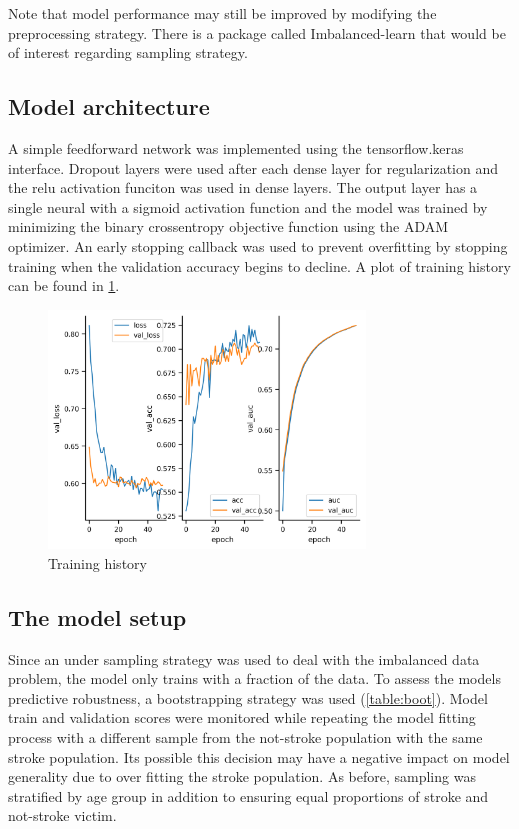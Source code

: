 \documentclass[12pt]{article}
\begin{document}
    Note that model performance may still be improved by modifying the preprocessing strategy. There is a
    package called Imbalanced-learn that would be of interest regarding sampling strategy.

    \subsection{Model architecture}
    A simple feedforward network was implemented using the tensorflow.keras interface. Dropout layers were used
    after each dense layer for regularization and the relu activation funciton was used in dense layers. The output layer has a single
    neural with a sigmoid activation function and the model was trained by minimizing the binary crossentropy objective
    function using the ADAM optimizer. An early stopping callback was used to prevent overfitting by stopping training
    when the validation accuracy begins to decline. A plot of training history can be found in \cref{fig:training_history}.

    \begin{figure}
        \includegraphics[width=0.75\textwidth]{../data/Plots/history.png}
        \caption{Training history}
        \label{fig:training_history}
    \end{figure}

    \subsection{The model setup}
    Since an under sampling strategy was used to deal with the imbalanced data problem, the model only trains
    with a fraction of the data. To assess the models predictive robustness, a bootstrapping strategy was used (\cref{table:boot}).
    Model train and validation scores were monitored while repeating the model fitting process with a different sample
    from the not-stroke population with the same stroke population. Its possible this decision may have a negative impact
    on model generality due to over fitting the stroke population. As before, sampling was stratified by age group in
    addition to ensuring equal proportions of stroke and not-stroke victim.
\end{document}
